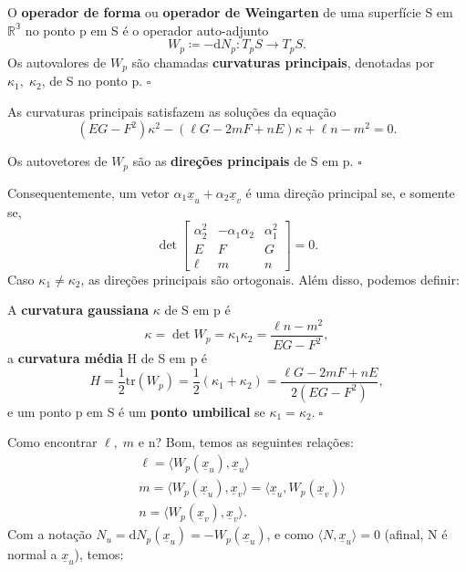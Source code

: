 \documentclass[../differential_geometry.tex]{subfiles}
\begin{document}
\begin{def*}
	O \textbf{operador de forma} ou \textbf{operador de Weingarten} de uma superfície S em \(\mathbb{R^{3}}\) no ponto p em S é o operador auto-adjunto
	\[
		W_p \coloneqq -\mathrm{d}N_p :T_pS\rightarrow T_pS.
	\]
	Os autovalores de \(W_p\) são chamadas \textbf{curvaturas principais}, denotadas por \(\kappa_1,\; \kappa_2\), de S no ponto p. \(\square\)
\end{def*}
As curvaturas principais satisfazem as soluções da equação
\[
	(EG-F^{2})\kappa^{2} - (\ell G - 2m F +nE)\kappa + \ell n - m^{2} = 0.
\]
\begin{def*}
	Os autovetores de \(W_p\) são as \textbf{direções principais} de S em p. \(\square\)
\end{def*}
Consequentemente, um vetor \(\alpha_1 \underline{x}_u + \alpha_2 \underline{x}_v\) é uma direção principal se, e somente se,
\[
	\det\begin{bmatrix}
		\alpha_{2}^{2} & -\alpha_1\alpha_2 & \alpha_{1}^{2} \\
		E              & F                 & G              \\
		\ell           & m                 & n
	\end{bmatrix} = 0.
\]
Caso \(\kappa_1\neq \kappa_2\), as direções principais são ortogonais. Além disso, podemos definir:
\begin{def*}
	A \textbf{curvatura gaussiana} \(\kappa \) de S em p é
	\[
		\kappa = \det{W_{p}} = \kappa_1 \kappa_2 = \frac{\ell n - m^{2}}{EG - F^{2}},
	\]
	a \textbf{curvatura média} H de S em p é
	\[
		H = \frac{1}{2}\mathrm{tr}(W_p) = \frac{1}{2}(\kappa_1+\kappa_2)=\frac{\ell G - 2mF +nE}{2(EG-F^{2})},
	\]
	e um ponto p em S é um \textbf{ponto umbilical} se \(\kappa_1 = \kappa_2.\; \square\)
\end{def*}
Como encontrar \(\ell ,\; m\) e n? Bom, temos as seguintes relações:
\begin{align*}
	 & \ell =\langle W_p(\underline{x}_u), \underline{x}_u  \rangle                                                      \\
	 & m = \langle W_p(\underline{x}_u), \underline{x}_v \rangle = \langle \underline{x}_u, W_p(\underline{x}_v) \rangle \\
	 & n = \langle W_p(\underline{x}_v), \underline{x}_v \rangle.
\end{align*}
Com a notação \(N_u = \mathrm{d}N_p(\underline{x}_u) = - W_p(\underline{x}_u)\), e como \(\langle N, \underline{x}_u \rangle = 0\) (afinal, N é normal a \(\underline{x}_u\)), temos:
\end{document}
